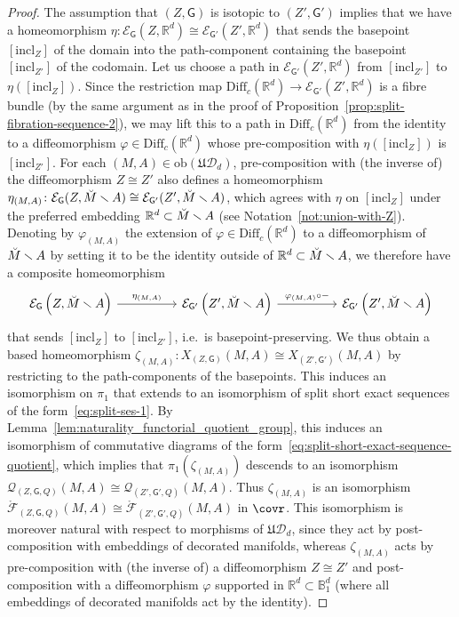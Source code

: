 \documentclass[AHL,Unicode,published]{cedram}
\newcommand{\Diff}{\mathrm{Diff}}
\newcommand{\obj}{\ensuremath{\mathrm{ob}}}
\newcommand{\rincl}{\mathrm{incl}}
\newcommand{\Int}{\mathring}
\newcommand{\fU}{\ensuremath{\mathfrak{U}}}
\newcommand{\sG}{\mathsf{G}}
\newcommand{\cD}{\mathcal{D}}
\newcommand{\cE}{\mathcal{E}}
\newcommand{\cF}{\mathcal{F}}
\newcommand{\cQ}{\mathcal{Q}}
\newcommand{\bB}{\mathbb{B}}
\newcommand{\bR}{\mathbb{R}}
\begin{document}
\begin{proof}
The assumption that $(Z,\sG)$ is isotopic to $(Z',\sG')$ implies that we have a homeomorphism $\eta \colon \cE_{\sG}(Z,\bR^d) \cong \cE_{\sG'}(Z',\bR^d)$ that sends the basepoint $[\rincl_Z]$ of the domain into the path-component containing the basepoint $[\rincl_{Z'}]$ of the codomain. Let us choose a path in $\cE_{\sG'}(Z',\bR^d)$ from $[\rincl_{Z'}]$ to $\eta([\rincl_Z])$. Since the restriction map $\Diff_c(\bR^d) \to \cE_{\sG'}(Z',\bR^d)$ is a fibre bundle (by the same argument as in the proof of Proposition~\ref{prop:split-fibration-sequence-2}), we may lift this to a path in $\Diff_c(\bR^d)$ from the identity to a diffeomorphism $\varphi \in \Diff_c(\bR^d)$ whose pre-composition with $\eta([\rincl_Z])$ is $[\rincl_{Z'}]$. For each $(M,A) \in \obj(\fU\cD_{d})$, pre-composition with (the inverse of) the diffeomorphism $Z \cong Z'$ also defines a homeomorphism $\eta_{(M,A)} \colon \cE_{\sG}(Z,\Breve{M} \smallsetminus A) \cong \cE_{\sG'}(Z',\Breve{M} \smallsetminus A)$, which agrees with $\eta$ on $[\rincl_Z]$ under the preferred embedding $\bR^d \subset \Breve{M} \smallsetminus A$ (see Notation~\ref{not:union-with-Z}). Denoting by $\varphi_{(M,A)}$ the extension of $\varphi \in \Diff_c(\bR^d)$ to a diffeomorphism of $\Breve{M} \smallsetminus A$ by setting it to be the identity outside of $\bR^d \subset \Breve{M} \smallsetminus A$, we therefore have a composite homeomorphism
\[
\begin{tikzcd}
\cE_{\sG}\left(Z,\Breve{M} \smallsetminus A\right) \ar[rr,"\eta_{(M,A)}"] && \cE_{\sG'}\left(Z',\Breve{M} \smallsetminus A\right) \ar[rr,"\varphi_{(M,A)} \circ -"] && \cE_{\sG'}\left(Z',\Breve{M} \smallsetminus A\right)
\end{tikzcd}
\]
that sends $[\rincl_Z]$ to $[\rincl_{Z'}]$, i.e.~is basepoint-preserving. We thus obtain a based homeomorphism $\zeta_{(M,A)} \colon X_{(Z,\sG)}(M,A) \cong X_{(Z',\sG')}(M,A)$ by restricting to the path-components of the basepoints. This induces an isomorphism on $\pi_{1}$ that extends to an isomorphism of split short exact sequences of the form~\eqref{eq:split-ses-1}. By Lemma~\ref{lem:naturality_functorial_quotient_group}, this induces an isomorphism of commutative diagrams of the form~\eqref{eq:split-short-exact-sequence-quotient}, which implies that $\pi_{1}(\zeta_{(M,A)})$ descends to an isomorphism $\cQ_{(Z,\sG,Q)}(M,A) \cong \cQ_{(Z',\sG',Q)}(M,A)$. Thus $\zeta_{(M,A)}$ is an isomorphism $\Int{\cF}_{(Z,\sG,Q)}(M,A) \cong \Int{\cF}_{(Z',\sG',Q)}(M,A)$ in $\covr$. This isomorphism is moreover natural with respect to morphisms of $\fU\cD_{d}$, since they act by post-composition with embeddings of decorated manifolds, whereas $\zeta_{(M,A)}$ acts by pre-composition with (the inverse of) a diffeomorphism $Z \cong Z'$ and post-composition with a diffeomorphism $\varphi$ supported in $\bR^d \subset \bB^d_{1}$ (where all embeddings of decorated manifolds act by the identity).
\end{proof}
\end{document}

